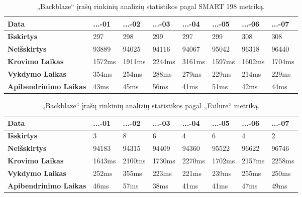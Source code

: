 \documentclass{VUMIFPSkursinis}
\begin{document}
\begin{table}[H]
\centering
\caption{„Backblaze“ įrašų rinkinių analizių statistikos pagal SMART 198 metriką.}
\label{tab:time198}
{\begin{tabular}{|l|l|l|l|l|l|l|l|}
\hline
\textbf{Data}                 & ...-01	   & ...-02     & ...-03     & ...-04 	  & ...-05     & ...-06     & ...-07     \\ \hline
\textbf{Išskirtys}            & 297        & 298        & 299        & 297        & 299        & 308        & 308        \\ \hline
\textbf{Neišskirtys}          & 93889      & 94025      & 94116      & 94067      & 95042      & 96318      & 96440      \\ \hline
\textbf{Krovimo Laikas}       & 1572ms     & 1911ms     & 2244ms     & 3161ms     & 1597ms     & 1602ms     & 1704ms     \\ \hline
\textbf{Vykdymo Laikas}       & 354ms      & 254ms      & 288ms      & 279ms      & 229ms      & 214ms      & 229ms      \\ \hline
\textbf{Apibendrinimo Laikas} & 43ms       & 45ms       & 56ms       & 41ms       & 51ms       & 42ms       & 44ms       \\ \hline
\end{tabular}}
\end{table}

\begin{table}[H]
\centering
\caption{„Backblaze“ įrašų rinkinių analizių statistikos pagal „Failure“ metriką.}
\label{tab:timeFail}
{\begin{tabular}{|l|l|l|l|l|l|l|l|}
\hline
\textbf{Data}                 & ...-01	   & ...-02     & ...-03     & ...-04 	  & ...-05     & ...-06     & ...-07     \\ \hline
\textbf{Išskirtys}            & 3          & 8          & 6          & 4          & 6          & 4          & 2          \\ \hline
\textbf{Neišskirtys}          & 94183      & 94315      & 94409      & 94360      & 95522      & 96622      & 96746      \\ \hline
\textbf{Krovimo Laikas}       & 1643ms     & 2100ms     & 1730ms     & 2270ms     & 1702ms     & 2157ms     & 2258ms     \\ \hline
\textbf{Vykdymo Laikas}       & 252ms      & 355ms      & 223ms      & 221ms      & 239ms      & 255ms      & 250ms      \\ \hline
\textbf{Apibendrinimo Laikas} & 46ms       & 57ms       & 38ms       & 41ms       & 41ms       & 47ms       & 49ms       \\ \hline
\end{tabular}}
\end{table}
\end{document}
